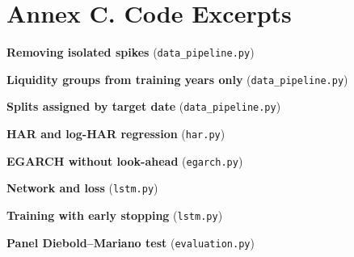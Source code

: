 \section*{Annex C. Code Excerpts}

\textbf{Removing isolated spikes} (\texttt{data\_pipeline.py})


\textbf{Liquidity groups from training years only} (\texttt{data\_pipeline.py})


\textbf{Splits assigned by target date} (\texttt{data\_pipeline.py})


\textbf{HAR and log-HAR regression} (\texttt{har.py})


\textbf{EGARCH without look-ahead} (\texttt{egarch.py})


\textbf{Network and loss} (\texttt{lstm.py})



\textbf{Training with early stopping} (\texttt{lstm.py})


\textbf{Panel Diebold--Mariano test} (\texttt{evaluation.py})


